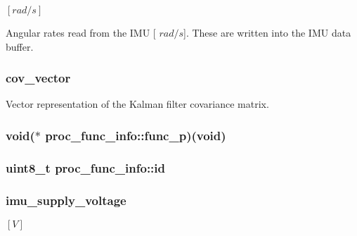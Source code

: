 $[rad/s]$ 

\-Angular rates read from the \-I\-M\-U \mbox{[} $rad/s$\mbox{]}. \-These are written into the \-I\-M\-U data buffer. \hypertarget{group__tables_ga74c09cdfc5b901e7f842dbe42ed8f4f4}{
\subsubsection[{cov\-\_\-vector}]{ {\bf cov\-\_\-vector}}}
\label{group__tables_ga74c09cdfc5b901e7f842dbe42ed8f4f4}


\-Vector representation of the \-Kalman filter covariance matrix. 

\hypertarget{group__tables_gab0d228e3d6f56666fb9d9bf0f25f8d7b}{
\subsubsection[{func\-\_\-p}]{\setlength{\rightskip}{0pt plus 5cm}void($\ast$ {\bf proc\-\_\-func\-\_\-info\-::func\-\_\-p})(void)}}
\label{group__tables_gab0d228e3d6f56666fb9d9bf0f25f8d7b}
\hypertarget{group__tables_ga133713acbe60983f171f71e2d81fae3f}{
\subsubsection[{id}]{\setlength{\rightskip}{0pt plus 5cm}uint8\-\_\-t {\bf proc\-\_\-func\-\_\-info\-::id}}}
\label{group__tables_ga133713acbe60983f171f71e2d81fae3f}
\hypertarget{group__tables_ga3f561003deb253bcc716a6c690c87cfe}{
\subsubsection[{imu\-\_\-supply\-\_\-voltage}]{ {\bf imu\-\_\-supply\-\_\-voltage}}}
\label{group__tables_ga3f561003deb253bcc716a6c690c87cfe}


$[V]$ 

